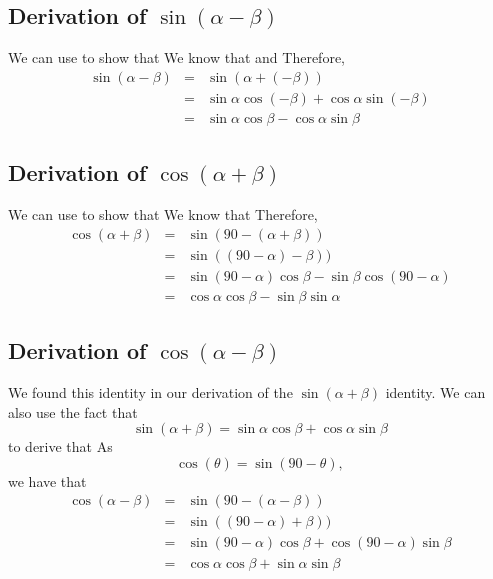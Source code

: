 \subsection{Derivation of $\sin(\alpha - \beta)$}
We can use
\nequ{\sin(\alpha + \beta) = \sin\alpha\cos\beta+\cos\alpha\sin\beta}
to show that
\nequ{\sin(\alpha - \beta) = \sin\alpha\cos\beta-\cos\alpha\sin\beta}
We know that
\nequ{\sin(-\theta) = -\sin(\theta)}
and
\nequ{\cos(-\theta) = \cos\theta}
Therefore,
\begin{eqnarray*}
\sin(\alpha-\beta)&=&\sin(\alpha + (-\beta))\\
&=&\sin\alpha\cos(-\beta)+\cos\alpha\sin(-\beta)\\
&=&\sin\alpha\cos\beta-\cos\alpha\sin\beta
\end{eqnarray*}

\subsection{Derivation of $\cos(\alpha + \beta)$}
We can use
\nequ{\sin(\alpha - \beta) = \sin\alpha\cos\beta-\sin\beta\cos\alpha}
to show that
\nequ{\cos(\alpha + \beta) = \cos\alpha\cos\beta-\sin\alpha\sin\beta}
We know that
Therefore,
\begin{eqnarray*}
\cos(\alpha+\beta)&=&\sin(90-(\alpha+\beta))\\
&=&\sin((90-\alpha)-\beta))\\
&=&\sin(90-\alpha)\cos\beta-\sin\beta\cos(90-\alpha)\\
&=&\cos\alpha\cos\beta-\sin\beta\sin\alpha
\end{eqnarray*}

\subsection{Derivation of $\cos(\alpha - \beta)$}
We found this identity in our derivation of the $\sin(\alpha+\beta)$ identity. We can also use the fact that
$$\sin(\alpha + \beta) = \sin\alpha\cos\beta+\cos\alpha\sin\beta$$
to derive that 
\nequ{\cos(\alpha - \beta) = \cos\alpha\cos\beta+\sin\alpha\sin\beta}
As
$$\cos(\theta) = \sin(90-\theta),$$
we have that
\begin{eqnarray*}
\cos(\alpha-\beta)&=&\sin(90-(\alpha-\beta))\\
&=&\sin((90-\alpha)+\beta))\\
&=&\sin(90-\alpha)\cos\beta+\cos(90-\alpha)\sin\beta\\
&=&\cos\alpha\cos\beta+\sin\alpha\sin\beta
\end{eqnarray*}

